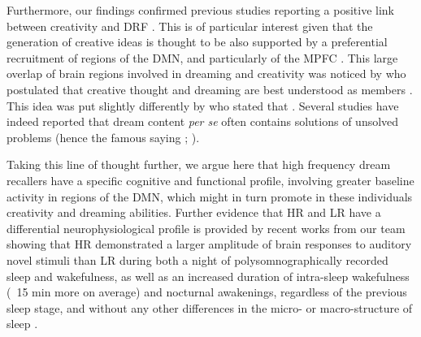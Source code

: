 Furthermore, our findings confirmed previous studies reporting a positive link between creativity and DRF \citep{fitch_variations_1989, schredl_creativity_1995, schredl_factors_2003}. This is of particular interest given that the generation of creative ideas is thought to be also supported by a preferential recruitment of regions of the DMN, and particularly of the MPFC \citep{dietrich_review_2010, ellamil_evaluative_2012, jung_structure_2013, beaty_creativity_2014, mok_interplay_2014, beaty_default_2015}. This large overlap of brain regions involved in dreaming and creativity was noticed by \citet{christoff_mind-wandering_2016} who postulated that creative thought and dreaming are best understood as members . This idea was put slightly differently by \citet{barrett_dreams_2017} who stated that . Several studies have indeed reported that dream content \emph{per se} often contains solutions of unsolved problems (hence the famous saying ;  \citealp{dement_relation_1957, barrett__1993}).

Taking this line of thought further, we argue here that high frequency dream recallers have a specific cognitive and functional profile, involving greater baseline activity in regions of the DMN, which might in turn promote in these individuals creativity and dreaming abilities. Further evidence that HR and LR have a differential neurophysiological profile is provided by recent works from our team showing that HR demonstrated a larger amplitude of brain responses to auditory novel stimuli than LR during both a night of polysomnographically recorded sleep and wakefulness, as well as an increased duration of intra-sleep wakefulness (~15 min more on average) and nocturnal awakenings, regardless of the previous sleep stage, and without any other differences in the micro- or macro-structure of sleep \citep{eichenlaub_brain_2014, vallat_increased_2017}.

